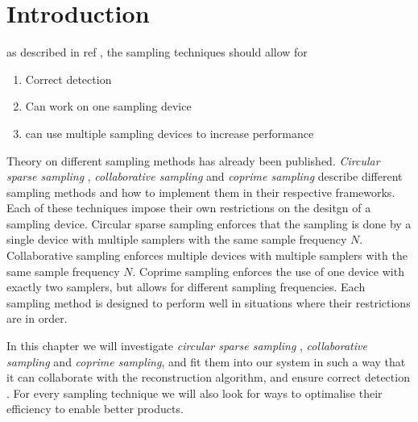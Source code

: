 \documentclass[a4paper, openany, oneside]{memoir}
\begin{document}
\section{Introduction}
as described in ref , the sampling techniques should allow for
\begin{enumerate}
    \item Correct detection 
    \item Can work on one sampling device
    \item can use multiple sampling devices to increase performance
\end{enumerate}

Theory on different sampling methods has already been published. \textit{Circular sparse sampling} \cite{ariananda2012compressive}, \textit{collaborative sampling} \cite{ariananda2014cooperative} and \textit{coprime sampling} \cite{pal2011coprime} describe different sampling methods and how to implement them in their respective frameworks. Each of these techniques impose their own restrictions on the desitgn of a sampling device. Circular sparse sampling enforces that the sampling is done by a single device with multiple samplers with the same sample frequency $N$. Collaborative sampling enforces multiple devices with multiple samplers with the same sample frequency $N$. Coprime sampling enforces the use of one device with exactly two samplers, but allows for different sampling frequencies. Each sampling method is designed to perform well in situations where their restrictions are in order.

In this chapter we will investigate \textit{circular sparse sampling} , \textit{collaborative sampling} and \textit{coprime sampling}, and fit them into our system in such a way that it can collaborate with the reconstruction algorithm, and ensure correct detection . For every sampling technique we will also look for ways to optimalise their efficiency to enable better products.
\end{document}
